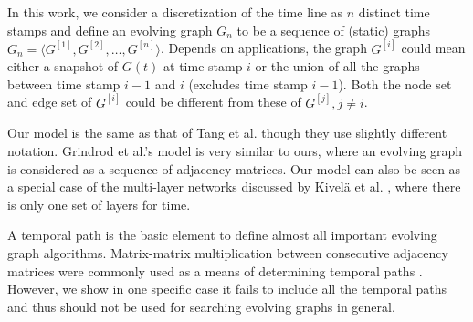 \documentclass[11pt,conference,compsocconf]{IEEEtran}
\theoremstyle{definition}
\begin{document}
In this work, we consider a discretization of the time line as $n$ distinct
time stamps and define an evolving graph $G_n$ to be
a sequence of (static) graphs
$G_n = \langle G^{[1]}, G^{[2]}, \ldots, G^{[n]} \rangle$.
Depends on applications, the graph $G^{[i]}$ could mean either
a snapshot of $G(t)$ at time stamp $i$ or  the union of all the graphs
between time stamp $i-1$ and $i$ (excludes time stamp $i-1$).
Both the node set and edge set of $G^{[i]}$ could be different from
these of $G^{[j]}, j \ne i$.
\begin{center}
\end{center}
Our model is the same as that of Tang et al. \cite{tmml10} though they
use slightly different notation.
Grindrod et al.'s model  \cite{gphe11} \cite{grihig13} is very similar to ours,
where an evolving graph is considered as a sequence of adjacency matrices.
Our model can also be seen as a special case of
the multi-layer networks discussed by Kivel{\"a} et al. \cite{kabg14}, where
there is only one set of layers for time.


A temporal path is the basic element to
 define almost  all important evolving graph algorithms.
Matrix-matrix multiplication between consecutive adjacency matrices
were commonly used as a means of determining temporal paths \cite{gphe11,grihig13}. However, we show
in one specific case it fails to include all the temporal paths and thus should not be used
for searching evolving graphs in general.
\end{document}

